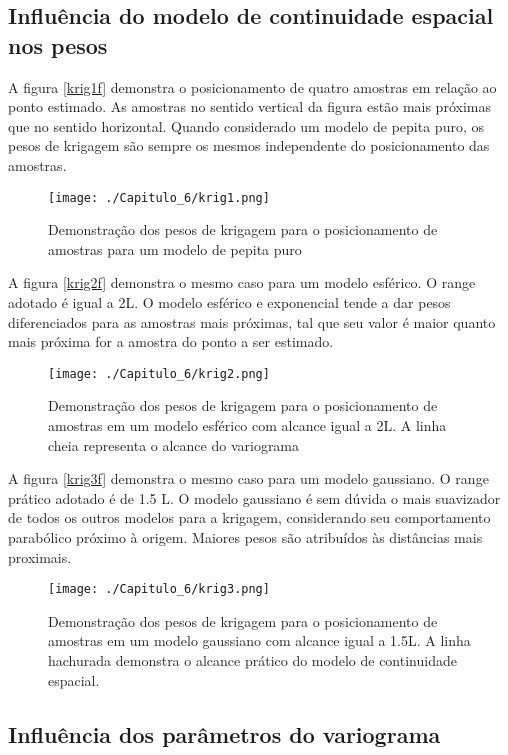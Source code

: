 \subsection{Influência do modelo de continuidade espacial nos pesos}

A figura \eqref{krig1f} demonstra o posicionamento de quatro amostras em relação ao ponto estimado. As amostras no sentido vertical da figura estão mais próximas que no sentido horizontal. Quando considerado um modelo de pepita puro, os pesos de krigagem são sempre os mesmos independente do posicionamento das amostras.

\begin{figure}[H]
  	\centering
  	\texttt{[image: ./Capitulo\_6/krig1.png]}
  	\caption{Demonstração dos pesos de krigagem para o posicionamento de amostras para um modelo de pepita puro}
  	\label{krig1f}
\end{figure}

A figura \eqref{krig2f} demonstra o mesmo caso para um modelo esférico. O range adotado é igual a 2L. O modelo esférico e exponencial tende a dar pesos diferenciados para as amostras mais próximas, tal que seu valor é maior quanto mais próxima for a amostra do ponto a ser estimado. 

\begin{figure}[!]
  	\centering
  	\texttt{[image: ./Capitulo\_6/krig2.png]}
  	\caption{Demonstração dos pesos de krigagem para o posicionamento de amostras em um modelo esférico com alcance igual a 2L. A linha cheia representa o alcance do variograma}
  	\label{krig2f}
\end{figure}

A figura \eqref{krig3f} demonstra o mesmo caso para um modelo gaussiano. O range prático adotado é de 1.5 L. O modelo gaussiano é sem dúvida o mais suavizador de todos os outros modelos para a krigagem, considerando seu comportamento parabólico  próximo à origem. Maiores pesos são atribuídos às distâncias mais proximais. 


\begin{figure}[!]
  	\centering
  	\texttt{[image: ./Capitulo\_6/krig3.png]}
  	\caption{Demonstração dos pesos de krigagem para o posicionamento de amostras em um modelo gaussiano com alcance igual a 1.5L. A linha hachurada demonstra o alcance prático do modelo de continuidade espacial.}
  	\label{krig3f}
\end{figure}

\subsection{Influência dos parâmetros do variograma}

